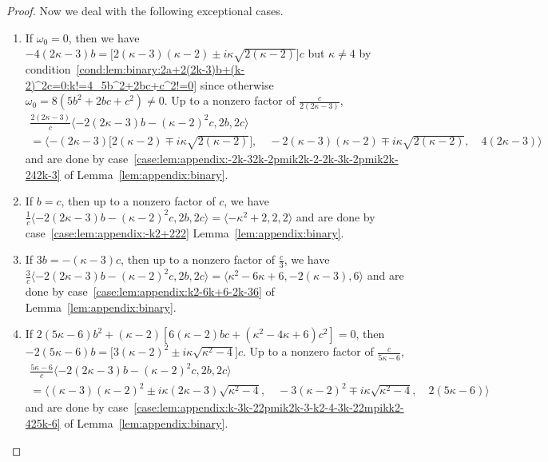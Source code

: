 \documentclass[11pt]{article}
\begin{document}
\begin{proof}
 Now we deal with the following exceptional cases.
 \begin{enumerate}
  \item If $\omega_0 = 0$,
  then we have $-4 (2 \kappa - 3) b = \big[2 (\kappa - 3) (\kappa - 2) \pm i \kappa \sqrt{2 (\kappa - 2)}\big] c$
  but $\kappa \ne 4$ by condition~\ref{cond:lem:binary:2a+2(2k-3)b+(k-2)^2c=0:k!=4_5b^2+2bc+c^2!=0} since otherwise $\omega_0 = 8 (5 b^2 + 2 b c + c^2) \ne 0$.
  Up to a nonzero factor of $\frac{c}{2 (2 \kappa - 3)}$,
  \begin{multline*}
   \frac{2 (2 \kappa - 3)}{c}
   \langle -2 (2 \kappa - 3) b - (\kappa - 2)^2 c, 2 b, 2 c \rangle\\
   =
   \langle
    -(2 \kappa - 3) \big[2 (\kappa - 2) \mp i \kappa \sqrt{2 (\kappa - 2)}\big],
    \quad
    -2 (\kappa - 3) (\kappa - 2) \mp i \kappa \sqrt{2 (\kappa - 2)},
    \quad
    4 (2 \kappa - 3)
   \rangle
  \end{multline*}
  and are done by case~\ref{case:lem:appendix:-2k-32k-2pmik2k-2-2k-3k-2pmik2k-242k-3} of Lemma~\ref{lem:appendix:binary}.
  
  \item If $b = c$,
  then up to a nonzero factor of $c$,
  we have $\frac{1}{c} \langle -2 (2 \kappa - 3) b - (\kappa - 2)^2 c, 2 b, 2 c \rangle = \langle -\kappa^2 + 2, 2, 2 \rangle$
  and are done by case~\ref{case:lem:appendix:-k2+222} Lemma~\ref{lem:appendix:binary}.
  
  \item If $3 b = -(\kappa - 3) c$,
  then up to a nonzero factor of $\frac{c}{3}$,
  we have $\frac{3}{c} \langle -2 (2 \kappa - 3) b - (\kappa - 2)^2 c, 2 b, 2 c \rangle = \langle \kappa^2 - 6 \kappa + 6, -2 (\kappa - 3), 6 \rangle$
  and are done by case~\ref{case:lem:appendix:k2-6k+6-2k-36} of Lemma~\ref{lem:appendix:binary}.
  
  \item If $2 (5 \kappa - 6) b^2 + (\kappa - 2) [6 (\kappa - 2) b c + (\kappa^2 - 4 \kappa + 6) c^2] = 0$,
  then $-2 (5 \kappa - 6) b = \big[3 (\kappa - 2)^2  \pm i \kappa \sqrt{\kappa^2 - 4}\big] c$.
  Up to a nonzero factor of $\frac{c}{5 \kappa - 6}$,
  \begin{multline*}
   \frac{5 \kappa - 6}{c}
   \langle -2 (2 \kappa - 3) b - (\kappa - 2)^2 c, 2 b, 2 c \rangle\\
   =
   \langle
    (\kappa - 3) (\kappa - 2)^2 \pm i \kappa (2 \kappa - 3) \sqrt{\kappa^2 - 4},
    \quad
    -3 (\kappa - 2)^2 \mp i \kappa \sqrt{\kappa^2 - 4},
    \quad
    2 (5 \kappa - 6)
   \rangle
  \end{multline*}
  and are done by case~\ref{case:lem:appendix:k-3k-22pmik2k-3-k2-4-3k-22mpikk2-425k-6} of Lemma~\ref{lem:appendix:binary}.
  \qedhere
 \end{enumerate}
\end{proof}
\end{document}
